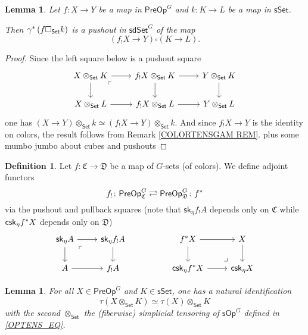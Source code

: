 \documentclass[a4paper,10pt
,draft
]{article}%
\numberwithin{equation}{section}
\numberwithin{figure}{section}
\newtheorem{lemma}[equation]{Lemma}%
\theoremstyle{definition} %
\newtheorem{definition}[equation]{Definition}%
\newcommand{\sSet}{\ensuremath{\mathsf{sSet}}}%
\newcommand{\sOp}{\ensuremath{\mathsf{sOp}}}%
\newcommand{\1}{\ensuremath{\mathbbm 1}}%
\begin{document}
\begin{lemma}\label{OTIMSETPUSH LEM}
	Let $f\colon X \to Y$ be a map in $\mathsf{PreOp}^G$
	and $k \colon K \to L$ be a map in $\mathsf{sSet}$.

	Then $\gamma^{\**}\left(f \square_{\mathsf{Set}} k\right)$
	is a pushout in $\mathsf{sdSet}^G$
	of the map
\[
	\left(f_! X \to Y\right)
	\square
	\left( K \to L \right).
\]
\end{lemma}


\begin{proof}
Since the left square below is a pushout square
\[
\begin{tikzcd}
	X \otimes_{\mathsf{Set}} K \ar{r} \ar{d} 
	\arrow[dr, phantom, "\ulcorner", very near start]
&
	f_! X \otimes_{\mathsf{Set}} K \ar{r} \ar{d} 
&
	Y \otimes_{\mathsf{Set}} K \ar{d}
\\
	X \otimes_{\mathsf{Set}} L \ar{r} 
&
	f_! X \otimes_{\mathsf{Set}} L \ar{r} 
&
	Y \otimes_{\mathsf{Set}} L
\end{tikzcd}
\]
one has
$(X \to Y) \otimes_{\mathsf{Set}} k \simeq 
(f_!X \to Y) \otimes_{\mathsf{Set}} k$.
And since $f_!X \to Y$ is the identity on colors,
the result follows from Remark \ref{COLORTENSGAM REM}.
	{\color{blue} plus some mumbo jumbo about cubes and pushouts}
\end{proof}



\begin{definition}
	Let $f \colon \mathfrak{C} \to \mathfrak{D}$
	be a map of $G$-sets (of colors).
	We define adjoint functors
	\[
	f_{!} \colon
	\mathsf{PreOp}^{G}_{\mathfrak{C}}
	\rightleftarrows
	\mathsf{PreOp}^{G}_{\mathfrak{D}}
	\colon f^{\**}
	\]
	via the pushout and pullback squares
	(note that $\mathsf{sk}_{\eta} f_! A$ depends only on 
	$\mathfrak{C}$ while 
	$\mathsf{csk}_{\eta} f^{\**} X$ depends only on
	$\mathfrak{D}$)
	\[
	\begin{tikzcd}
	\mathsf{sk}_{\eta} A \ar{r} \ar{d} \arrow[dr, phantom, "\ulcorner", very near start]  &
	\mathsf{sk}_{\eta} f_! A \ar{d}
	&&
	f^{\**} X \ar{r} \ar{d} &
	X \ar{d}
	\\
	A \ar{r} & 
	f_! A
	&&
	\mathsf{csk}_{\eta} f^{\**} X \ar{r} & 
	\mathsf{csk}_{\eta} X
	\arrow[ul, phantom, "\lrcorner", very near start]
	\end{tikzcd}
	\]
\end{definition}





\begin{lemma}\label{TAUOTIMES_LEM}
	For all $X \in \mathsf{PreOp}^G$ and $K \in \sSet$, 
	one has a natural identification
	\[\tau(X \otimes_{\mathsf{Set}} K) \simeq \tau(X) \otimes_{\mathsf{Set}} K\]
	with the second $\otimes_{\mathsf{Set}}$ the (fiberwise) simplicial tensoring of $\sOp^G$ defined in \eqref{OPTENS_EQ}.
\end{lemma}
\end{document}
